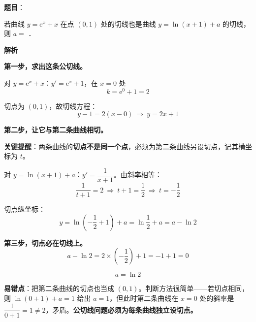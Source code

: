 \begin{answer}

\textbf{题目}：

若曲线 $y=\mathrm{e}^{x}+x$ 在点 $(0,1)$ 处的切线也是曲线 $y=\ln(x+1)+a$ 的切线，则 $a=$ \gkblank{}．

\textbf{解析}

\textbf{第一步，求出这条公切线。}

对 $y=\mathrm e^{x}+x$：$y'=\mathrm e^{x}+1$，在 $x=0$ 处
\nopagebreak[4]
\[k=\mathrm e^{0}+1=2\]

切点为 $(0,1)$，故切线方程：
\nopagebreak[4]
\[y-1=2(x-0)\ \Longrightarrow\ y=2x+1\]

\textbf{第二步，让它与第二条曲线相切。}

\textbf{关键提醒}：两条曲线的\textbf{切点不是同一个点}，必须为第二条曲线另设切点，记其横坐标为 $t$。

对 $y=\ln(x+1)+a$：$y'=\dfrac1{x+1}$。由斜率相等：
\nopagebreak[4]
\[\frac1{t+1}=2\ \Longrightarrow\ t+1=\frac12\ \Longrightarrow\ t=-\frac12\]

切点纵坐标：
\nopagebreak[4]
\[y=\ln\left(-\frac12+1\right)+a=\ln\frac12+a=a-\ln2\]

\textbf{第三步，切点必在切线上。}
\nopagebreak[4]
\[a-\ln2=2\times\left(-\frac12\right)+1=-1+1=0\]

\nopagebreak[4]
\[a=\ln2\]

\begin{gktip}
\textbf{易错点}：把第二条曲线的切点也当成 $(0,1)$。判断方法很简单——若切点相同，则 $\ln(0+1)+a=1$ 给出 $a=1$，但此时第二条曲线在 $x=0$ 处的斜率是 $\dfrac1{0+1}=1\ne2$，矛盾。\textbf{公切线问题必须为每条曲线独立设切点。}
\end{gktip}


\par\medskip

\end{answer}
